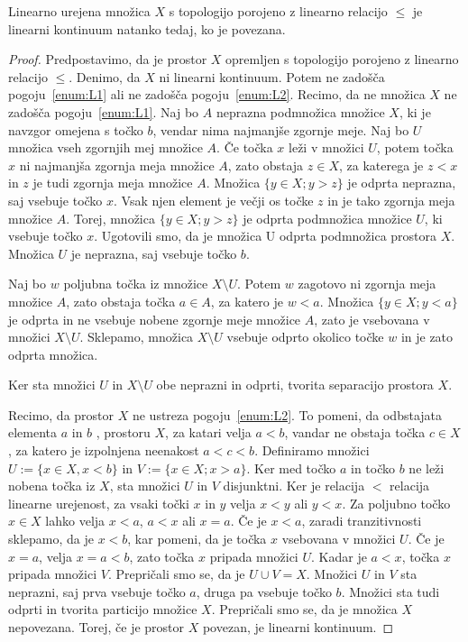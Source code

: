 \documentclass[../TG_magistrsko_delo_sections.tex]{subfiles}
\begin{document}
\begin{trditev}
Linearno urejena množica $X$ s topologijo porojeno z linearno relacijo $\leq$ je linearni kontinuum natanko tedaj, ko je povezana.
\end{trditev}
\begin{proof}
Predpostavimo, da je prostor $X$ opremljen s topologijo porojeno z linearno relacijo $\leq$. Denimo, da $X$ ni linearni kontinuum. Potem ne zadošča pogoju~\ref{enum:L1} ali ne zadošča pogoju~\ref{enum:L2}. Recimo, da ne množica $X$ ne zadošča pogoju~\ref{enum:L1}. Naj bo $A$ neprazna podmnožica množice $X$, ki je navzgor omejena s točko $b$, vendar nima najmanjše zgornje meje. Naj bo $U$ množica vseh zgornjih mej množice $A$. Če točka $x$ leži v množici $U$, potem točka $x$ ni najmanjša zgornja meja množice $A$, zato obstaja $z \in X$, za katerega je $z < x$ in $z$ je tudi zgornja meja množice $A$. Množica $\{y \in X; y > z\}$ je odprta neprazna, saj vsebuje točko $x$. Vsak njen element je večji os točke $z$ in je tako zgornja meja množice $A$. Torej, množica $\{y \in X; y > z\}$ je odprta podmnožica množice $U$, ki vsebuje točko $x$. Ugotovili smo, da je množica U odprta podmnožica prostora $X$. Množica $U$ je neprazna, saj vsebuje točko $b$. 

Naj bo $w$ poljubna točka iz množice $X \setminus U$. Potem $w$ zagotovo ni zgornja meja množice $A$, zato obstaja točka $a \in A$, za katero je $w < a$. Množica $\{y \in X; y< a\}$ je odprta in ne vsebuje nobene zgornje meje množice $A$, zato je vsebovana v množici $X \setminus U$. Sklepamo, množica $X \setminus U$ vsebuje odprto okolico točke $w$ in je zato odprta množica. 

Ker sta množici $U$ in $X \setminus U$ obe neprazni in odprti, tvorita separacijo prostora $X$. 

Recimo, da prostor $X$ ne ustreza pogoju~\ref{enum:L2}. To pomeni, da odbstajata elementa $a$ in $b$ , prostoru $X$, za katari velja $a < b$, vandar ne obstaja točka $c \in X$, za katero je izpolnjena neenakost $a < c < b$. Definiramo množici $U := \{x \in X, x <b\}$ in $V:= \{x\in X;x>a\}$. Ker med točko $a$ in točko $b$ ne leži nobena točka iz $X$, sta množici $U$ in $V$ disjunktni. Ker je relacija $<$ relacija linearne urejenost, za vsaki točki $x$ in $y$ velja $x < y$ ali $y < x$. Za poljubno točko $x \in X$ lahko velja $x<a$, $a<x$ ali $x=a$.
Če je $x<a$, zaradi tranzitivnosti sklepamo, da je $x<b$, kar pomeni, da je točka $x$ vsebovana v množici $U$. Če je $x=a$, velja $x=a<b$, zato točka $x$ pripada množici $U$. Kadar je $a<x$, točka $x$ pripada množici $V$. Prepričali smo se, da je $U \cup V = X$. Množici $U$ in $V$ sta neprazni, saj prva vsebuje točko $a$, druga pa vsebuje točko $b$. Množici sta tudi odprti in tvorita particijo množice $X$. Prepričali smo se, da je množica $X$ nepovezana.
Torej, če je prostor $X$ povezan, je linearni kontinuum.


\end{proof}
\end{document}
